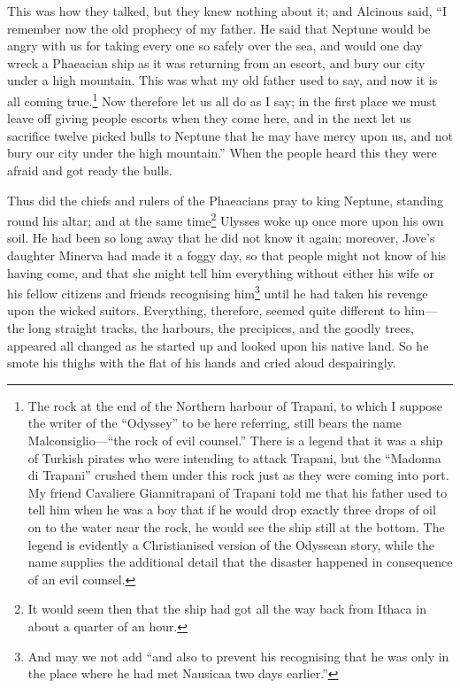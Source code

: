 This was how they talked, but they knew nothing about it; and Alcinous said, “I
remember now the old prophecy of my father. He said that Neptune would be angry
with us for taking every one so safely over the sea, and would one day wreck a
Phaeacian ship as it was returning from an escort, and bury our city under a
high mountain. This was what my old father used to say, and now it is all
coming true.\footnote{The rock at the end of the Northern harbour of Trapani, to which I suppose
the writer of the “Odyssey” to be here referring, still bears the name
Malconsiglio—“the rock of evil counsel.” There is a legend that it was a ship
of Turkish pirates who were intending to attack Trapani, but the “Madonna di
Trapani” crushed them under this rock just as they were coming into port. My
friend Cavaliere Giannitrapani of Trapani told me that his father used to tell
him when he was a boy that if he would drop exactly three drops of oil on to
the water near the rock, he would see the ship still at the bottom. The legend
is evidently a Christianised version of the Odyssean story, while the name
supplies the additional detail that the disaster happened in consequence of an
evil counsel.}
Now therefore let us all do as I say; in the first place we must leave off
giving people escorts when they come here, and in the next let us sacrifice
twelve picked bulls to Neptune that he may have mercy upon us, and not bury our
city under the high mountain.” When the people heard this they were afraid and
got ready the bulls.

Thus did the chiefs and rulers of the Phaeacians pray to king Neptune, standing
round his altar; and at the same time\footnote{It would seem then that the ship had got all the way back from Ithaca in
about a quarter of an hour.} Ulysses woke up once more upon his
own soil. He had been so long away that he did not know it again; moreover,
Jove’s daughter Minerva had made it a foggy day, so that people might not know
of his having come, and that she might tell him everything without either his
wife or his fellow citizens and friends recognising him\footnote{And may we not add “and also to prevent his recognising that he was only in
the place where he had met Nausicaa two days earlier.”} until he had taken his revenge upon
the wicked suitors. Everything, therefore, seemed quite different to him—the
long straight tracks, the harbours, the precipices, and the goodly trees,
appeared all changed as he started up and looked upon his native land. So he
smote his thighs with the flat of his hands and cried aloud despairingly.


